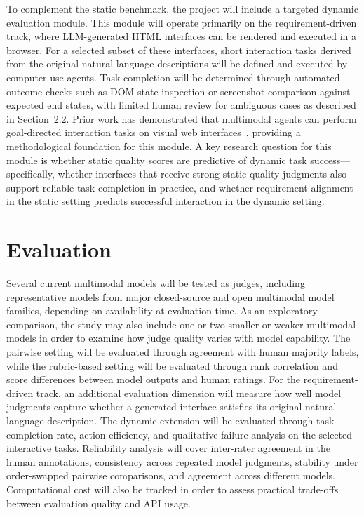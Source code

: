 \documentclass[pdflatex,sn-mathphys-num]{sn-jnl}
\begin{document}
To complement the static benchmark, the project will include a targeted dynamic
evaluation module. This module will operate primarily on the requirement-driven track,
where LLM-generated HTML interfaces can be rendered and executed in a browser. For a
selected subset of these interfaces, short interaction tasks derived from the original
natural language descriptions will be defined and executed by computer-use agents.
Task completion will be determined through automated outcome checks such as DOM state
inspection or screenshot comparison against expected end states, with limited human
review for ambiguous cases as described in Section~2.2. Prior work has demonstrated
that multimodal agents can perform goal-directed interaction tasks on visual web
interfaces~\cite{visualwebarena}, providing a methodological foundation for this
module. A key research question for this module is whether static quality scores are
predictive of dynamic task success---specifically, whether interfaces that receive
strong static quality judgments also support reliable task completion in practice, and
whether requirement alignment in the static setting predicts successful interaction in
the dynamic setting.

\section{Evaluation}\label{sec:evaluation}

Several current multimodal models will be tested as judges, including representative
models from major closed-source and open multimodal model families, depending on
availability at evaluation time. As an exploratory comparison, the study may also
include one or two smaller or weaker multimodal models in order to examine how judge
quality varies with model capability. The pairwise setting will be evaluated through
agreement with human majority labels, while the rubric-based setting will be evaluated
through rank correlation and score differences between model outputs and human ratings.
For the requirement-driven track, an additional evaluation dimension will measure how
well model judgments capture whether a generated interface satisfies its original
natural language description. The dynamic extension will be evaluated through task
completion rate, action efficiency, and qualitative failure analysis on the selected
interactive tasks. Reliability analysis will cover inter-rater agreement in the human
annotations, consistency across repeated model judgments, stability under order-swapped
pairwise comparisons, and agreement across different models. Computational cost will
also be tracked in order to assess practical trade-offs between evaluation quality and
API usage.
\end{document}
